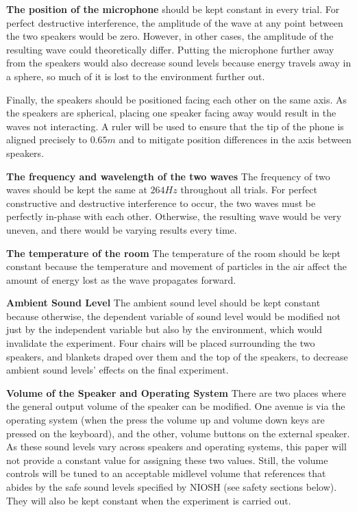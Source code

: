 \documentclass[index]{subfiles}
\begin{document}
\textbf{The position of the microphone} should be kept constant in every trial. For perfect destructive interference, the amplitude of the wave at any point between the two speakers would be zero. However, in other cases, the amplitude of the resulting wave could theoretically differ. Putting the microphone further away from the speakers would also decrease sound levels because energy travels away in a sphere, so much of it is lost to the environment further out. 

Finally, the speakers should be positioned facing each other on the same axis. As the speakers are spherical, placing one speaker facing away would result in the waves not interacting. A ruler will be used to ensure that the tip of the phone is aligned precisely to \(0.65m\) and to mitigate position differences in the axis between speakers. 

\textbf{The frequency and wavelength of the two waves} The frequency of two waves should be kept the same at \(264Hz\) throughout all trials. For perfect constructive and destructive interference to occur, the two waves must be perfectly in-phase with each other. Otherwise, the resulting wave would be very uneven, and there would be varying results every time.

\textbf{The temperature of the room} The temperature of the room should be kept constant because the temperature and movement of particles in the air affect the amount of energy lost as the wave propagates forward.

\textbf{Ambient Sound Level} The ambient sound level should be kept constant because otherwise, the dependent variable of sound level would be modified not just by the independent variable but also by the environment, which would invalidate the experiment. Four chairs will be placed surrounding the two speakers, and blankets draped over them and the top of the speakers, to decrease ambient sound levels' effects on the final experiment.

\textbf{Volume of the Speaker and Operating System} There are two places where the general output volume of the speaker can be modified. One avenue is via the operating system (when the press the volume up and volume down keys are pressed on the keyboard), and the other, volume buttons on the external speaker. As these sound levels vary across speakers and operating systems, this paper will not provide a constant value for assigning these two values. Still, the volume controls will be tuned to an acceptable midlevel volume that references that abides by the safe sound levels specified by NIOSH (see safety sections below). They will also be kept constant when the experiment is carried out.
\end{document}
